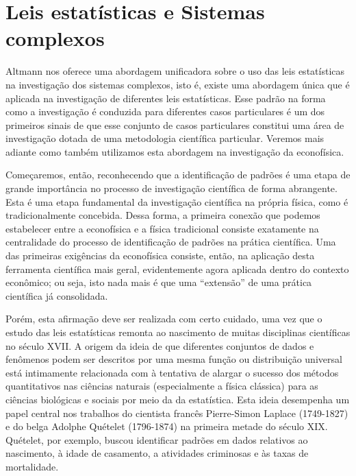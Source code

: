 \section{Leis estatísticas e Sistemas complexos}


Altmann  nos oferece uma abordagem unificadora sobre o uso das leis estatísticas na investigação dos sistemas complexos, isto é, existe uma abordagem única que é aplicada na investigação de diferentes leis estatísticas\cite{Altmann_2024}. Esse padrão na forma como a investigação é conduzida para diferentes casos particulares é um dos primeiros sinais  de que esse conjunto de casos particulares constitui uma área de investigação dotada de uma metodologia científica particular. Veremos mais adiante como também utilizamos esta abordagem na investigação da econofísica.

Começaremos,  então, reconhecendo que a identificação de padrões é uma etapa de grande importância no processo de investigação científica de forma abrangente. Esta é uma etapa fundamental da investigação científica na própria física, como é tradicionalmente concebida. Dessa forma, a primeira conexão que podemos estabelecer entre a econofísica e a física tradicional consiste exatamente na centralidade do processo de identificação de padrões na prática  científica.  Uma das primeiras exigências da econofísica consiste, então, na aplicação desta ferramenta científica mais geral, evidentemente agora aplicada dentro do contexto econômico; ou seja, isto nada mais é que uma ``extensão'' de uma prática científica já consolidada.  

Porém, esta afirmação deve ser realizada com certo cuidado, uma vez que o estudo das leis estatísticas remonta ao nascimento de muitas disciplinas científicas no século XVII. A origem da ideia de que diferentes conjuntos de dados e fenômenos podem ser descritos por uma mesma função ou distribuição universal está intimamente relacionada com à tentativa de alargar o sucesso dos métodos quantitativos nas ciências naturais (especialmente a física clássica) para as ciências biológicas e sociais por meio da da estatística. Esta ideia desempenha um papel central nos trabalhos do cientista francês Pierre-Simon Laplace (1749-1827) e do belga Adolphe Quételet (1796-1874) na primeira metade do século XIX. Quételet, por exemplo, buscou identificar padrões em dados relativos ao nascimento, à idade de casamento, a atividades criminosas e às taxas de mortalidade.

